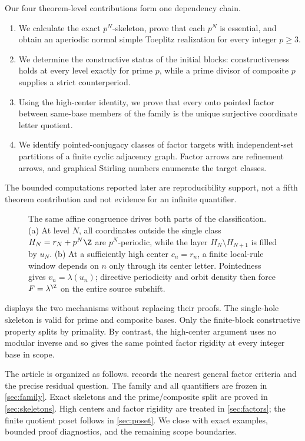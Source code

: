 Our four theorem-level contributions form one dependency chain.
\begin{enumerate}[label=(\roman*),leftmargin=2.2em]
  \item We calculate the exact $p^N$-skeleton, prove that each $p^N$ is
    essential, and obtain an aperiodic normal simple Toeplitz realization
    for every integer $p\geq3$.
  \item We determine the constructive status of the initial blocks:
    constructiveness holds at every level exactly for prime $p$, while a
    prime divisor of composite $p$ supplies a strict counterperiod.
  \item Using the high-center identity, we prove that every onto pointed
    factor between same-base members of the family is the unique
    surjective coordinate letter quotient.
  \item We identify pointed-conjugacy classes of factor targets with
    independent-set partitions of a finite cyclic adjacency graph.  Factor
    arrows are refinement arrows, and graphical Stirling numbers enumerate
    the target classes.
\end{enumerate}
The bounded computations reported later are reproducibility support, not a
fifth theorem contribution and not evidence for an infinite quantifier.

\begin{figure}[t]
  \centering
  \resizebox{\textwidth}{!}{}
  \caption{The same affine congruence drives both parts of the
  classification.  (a) At level $N$, all coordinates outside the single
  class $H_N=r_N+p^N\Z$ are $p^N$-periodic, while the layer
  $H_N\setminus H_{N+1}$ is filled by $u_N$.  (b) At a sufficiently high
  center $c_n=r_n$, a finite local-rule window depends on $n$ only through
  its center letter.  Pointedness gives $v_n=\lambda(u_n)$; directive
  periodicity and orbit density then force $F=\lambda^{\Z}$ on the entire
  source subshift.}
  \label{fig:mechanism}
\end{figure}

 displays the two mechanisms without replacing their
proofs.  The single-hole skeleton is valid for prime and composite bases.
Only the finite-block constructive property splits by primality.  By
contrast, the high-center argument uses no modular inverse and so gives the
same pointed factor rigidity at every integer base in scope.

The article is organized as follows.   records the nearest
general factor criteria and the precise residual question.  The family and
all quantifiers are frozen in \cref{sec:family}.  Exact skeletons and the
prime/composite split are proved in \cref{sec:skeletons}.  High centers and
factor rigidity are treated in \cref{sec:factors}; the finite quotient
poset follows in \cref{sec:poset}.  We close with exact examples, bounded
proof diagnostics, and the remaining scope boundaries.

